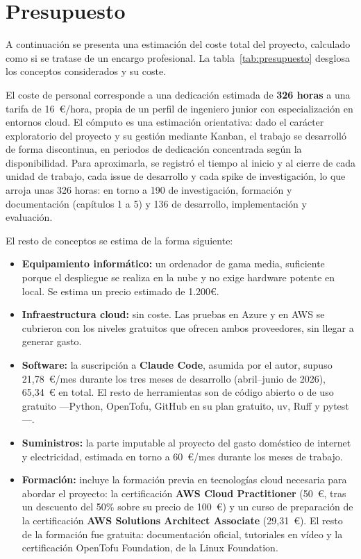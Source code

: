 \section{Presupuesto}

A continuación se presenta una estimación del coste total del proyecto, calculado como
si se tratase de un encargo profesional. La tabla~\ref{tab:presupuesto} desglosa los
conceptos considerados y su coste.

El coste de personal corresponde a una dedicación estimada de \textbf{326 horas} a una
tarifa de 16~€/hora, propia de un perfil de ingeniero junior con especialización en
entornos cloud. El cómputo es una estimación orientativa: dado el carácter exploratorio
del proyecto y su gestión mediante Kanban, el trabajo se desarrolló de forma discontinua,
en periodos de dedicación concentrada según la disponibilidad. Para aproximarla, se
registró el tiempo al inicio y al cierre de cada unidad de trabajo, cada issue de
desarrollo y cada spike de investigación, lo que arroja unas 326 horas: en torno a 190
de investigación, formación y documentación (capítulos 1 a 5) y 136 de desarrollo,
implementación y evaluación.

El resto de conceptos se estima de la forma siguiente:

\begin{itemize}
    \item \textbf{Equipamiento informático:} un ordenador de gama media, suficiente porque
    el despliegue se realiza en la nube y no exige hardware potente en local. Se estima un precio estimado de 1.200€.

    \item \textbf{Infraestructura cloud:} sin coste. Las pruebas en Azure y en AWS se
    cubrieron con los niveles gratuitos que ofrecen ambos proveedores, sin llegar a generar
    gasto.

    \item \textbf{Software:} la suscripción a \textbf{Claude Code}, asumida por el autor,
    supuso 21,78~€/mes durante los tres meses de desarrollo (abril–junio de 2026), 65,34~€
    en total. El resto de herramientas son de código abierto o de uso gratuito —Python,
    OpenTofu, GitHub en su plan gratuito, uv, Ruff y pytest—.

    \item \textbf{Suministros:} la parte imputable al proyecto del gasto doméstico de internet
    y electricidad, estimada en torno a 60~€/mes durante los meses de trabajo.

    \item \textbf{Formación:} incluye la formación previa en tecnologías cloud necesaria para
    abordar el proyecto: la certificación \textbf{AWS Cloud Practitioner} (50~€, tras un
    descuento del 50\% sobre su precio de 100~€) y un curso de preparación de la certificación
    \textbf{AWS Solutions Architect Associate} (29,31~€). El resto de la formación fue gratuita:
    documentación oficial, tutoriales en vídeo y la certificación OpenTofu Foundation, de la
    Linux Foundation.
\end{itemize}


